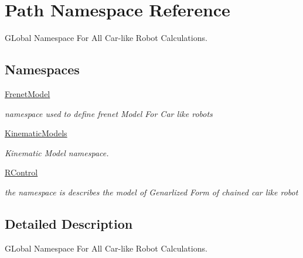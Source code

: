 \hypertarget{namespace_path}{}\section{Path Namespace Reference}
\label{namespace_path}


G\+Lobal Namespace For All Car-\/like Robot Calculations.  


\subsection*{Namespaces}
\begin{DoxyCompactItemize}
\item 
 \hyperlink{namespace_path_1_1_frenet_model}{Frenet\+Model}
\begin{DoxyCompactList}\small\item\em namespace used to define frenet Model For Car like robots \end{DoxyCompactList}\item 
 \hyperlink{namespace_path_1_1_kinematic_models}{Kinematic\+Models}
\begin{DoxyCompactList}\small\item\em Kinematic Model namespace. \end{DoxyCompactList}\item 
 \hyperlink{namespace_path_1_1_r_control}{R\+Control}
\begin{DoxyCompactList}\small\item\em the namespace is describes the model of Genarlized Form of chained car like robot \end{DoxyCompactList}\end{DoxyCompactItemize}


\subsection{Detailed Description}
G\+Lobal Namespace For All Car-\/like Robot Calculations. 

